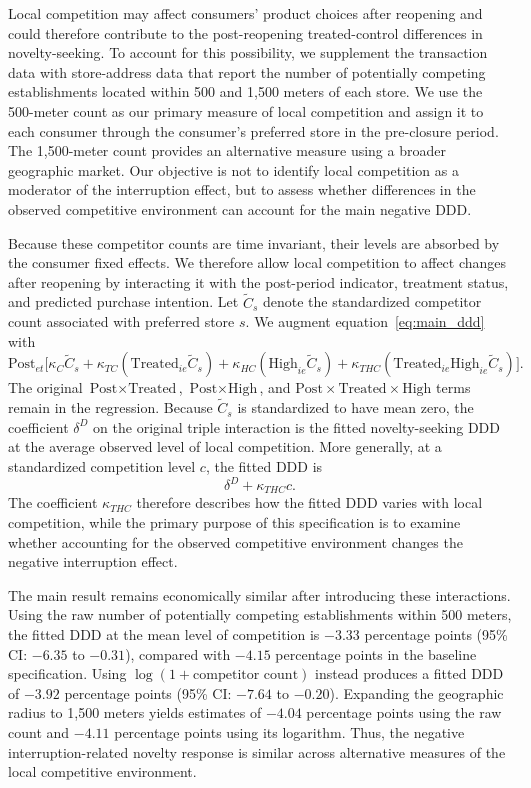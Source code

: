 \documentclass[11 pt]{article}
\begin{document}
Local competition may affect consumers' product choices after reopening and could therefore contribute to the post-reopening treated-control differences in novelty-seeking. To account for this possibility, we supplement the transaction data with store-address data that report the number of potentially competing establishments located within 500 and 1,500 meters of each store. We use the 500-meter count as our primary measure of local competition and assign it to each consumer through the consumer's preferred store in the pre-closure period. The 1,500-meter count provides an alternative measure using a broader geographic market. Our objective is not to identify local competition as a moderator of the interruption effect, but to assess whether differences in the observed competitive environment can account for the main negative DDD.

Because these competitor counts are time invariant, their levels are absorbed by the consumer fixed effects. We therefore allow local competition to affect changes after reopening by interacting it with the post-period indicator, treatment status, and predicted purchase intention. Let $\widetilde C_s$ denote the standardized competitor count associated with preferred store $s$. We augment equation~\eqref{eq:main_ddd} with
\begin{equation}
\text{Post}_{et}
\Big[
\kappa_C\widetilde C_s
+
\kappa_{TC}
\left(
\text{Treated}_{ie}\widetilde C_s
\right)
+
\kappa_{HC}
\left(
\text{High}_{ie}\widetilde C_s
\right)
+
\kappa_{THC}
\left(
\text{Treated}_{ie}\text{High}_{ie}\widetilde C_s
\right)
\Big].
\label{eq:local_competition_ddd}
\end{equation}
The original $\text{Post}\times\text{Treated}$, $\text{Post}\times\text{High}$, and $\text{Post}\times\text{Treated}\times\text{High}$ terms remain in the regression. Because $\widetilde C_s$ is standardized to have mean zero, the coefficient $\delta^D$ on the original triple interaction is the fitted novelty-seeking DDD at the average observed level of local competition. More generally, at a standardized competition level $c$, the fitted DDD is
\[
\delta^D+\kappa_{THC}c.
\]
The coefficient $\kappa_{THC}$ therefore describes how the fitted DDD varies with local competition, while the primary purpose of this specification is to examine whether accounting for the observed competitive environment changes the negative interruption effect.

The main result remains economically similar after introducing these interactions. Using the raw number of potentially competing establishments within 500 meters, the fitted DDD at the mean level of competition is $-3.33$ percentage points (95\% CI: $-6.35$ to $-0.31$), compared with $-4.15$ percentage points in the baseline specification. Using $\log(1+\text{competitor count})$ instead produces a fitted DDD of $-3.92$ percentage points (95\% CI: $-7.64$ to $-0.20$). Expanding the geographic radius to 1,500 meters yields estimates of $-4.04$ percentage points using the raw count and $-4.11$ percentage points using its logarithm. Thus, the negative interruption-related novelty response is similar across alternative measures of the local competitive environment.
\end{document}
